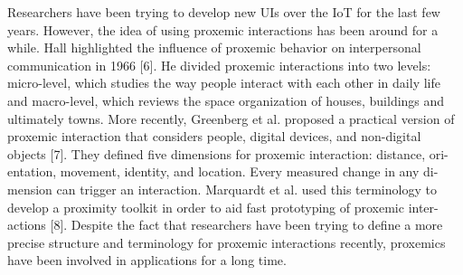 \documentclass[runningheads,a4paper]{llncs}
\begin{document}
Researchers have been trying to develop new UIs over the IoT for the last few years. However, the idea of using proxemic interactions has been around for a while. Hall highlighted the influence of proxemic behavior on interpersonal communication in 1966 [6]. He divided proxemic interactions into two levels: micro-level, which studies the way people interact with each other in daily life and macro-level, which reviews the space organization of houses, buildings and ultimately towns. More recently, Greenberg et al. proposed a practical version of proxemic interaction that considers people, digital devices, and non-digital objects [7]. They defined five dimensions for proxemic interaction: distance, ori- entation, movement, identity, and location. Every measured change in any di- mension can trigger an interaction. Marquardt et al. used this terminology to develop a proximity toolkit in order to aid fast prototyping of proxemic inter- actions [8]. Despite the fact that researchers have been trying to define a more precise structure and terminology for proxemic interactions recently, proxemics have been involved in applications for a long time. 
\newline
\newpage
\end{document}
